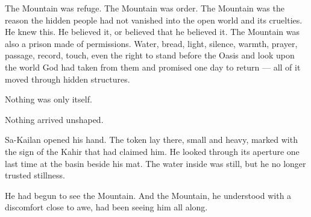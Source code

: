 The Mountain was refuge.
The Mountain was order.
The Mountain was the reason the hidden people had not vanished into the open world and its cruelties.
He knew this.
He believed it, or believed that he believed it.
The Mountain was also a prison made of permissions.
Water, bread, light, silence, warmth, prayer, passage, record, touch, even the right to stand before the Oasis and look upon the world God had taken from them and promised one day to return — all of it moved through hidden structures.\par

Nothing was only itself.\par

Nothing arrived unshaped.\par

Sa-Kailan opened his hand.
The token lay there, small and heavy, marked with the sign of the Kahir that had claimed him.
He looked through its aperture one last time at the basin beside his mat.
The water inside was still, but he no longer trusted stillness.\par

He had begun to see the Mountain.
And the Mountain, he understood with a discomfort close to awe, had been seeing him all along.\par

\ornament
